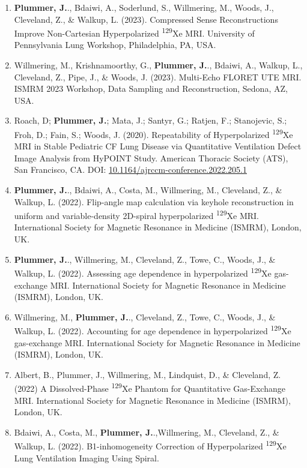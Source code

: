 \documentclass[12pt,]{scrartcl}
\begin{document}
\begin{enumerate}
  \item \textbf{Plummer, J.}., Bdaiwi, A., Soderlund, S., Willmering, M., Woods, J., Cleveland, Z., \& Walkup, L. (2023). Compressed Sense Reconstructions Improve Non-Cartesian Hyperpolarized \textsuperscript{129}Xe MRI. University of Pennsylvania Lung Workshop, Philadelphia, PA, USA.  
  
  \item Willmering, M., Krishnamoorthy, G., \textbf{Plummer, J.}., Bdaiwi, A., Walkup, L., Cleveland, Z., Pipe, J., \& Woods, J. (2023). Multi-Echo FLORET UTE MRI. ISMRM 2023 Workshop, Data Sampling and Reconstruction, Sedona, AZ, USA.  
  
  \item Roach, D; \textbf{ Plummer, J.}; Mata, J.; Santyr, G.; Ratjen, F.; Stanojevic, S.; Froh, D.; Fain, S.; Woods, J. (2020). Repeatability of Hyperpolarized \textsuperscript{129}Xe MRI in Stable Pediatric CF Lung Disease via Quantitative Ventilation Defect Image Analysis from HyPOINT Study. American Thoracic Society (ATS), San Francisco, CA. DOI: \href{https://www.atsjournals.org/doi/abs/10.1164/ajrccm-conference.2022.205.1_MeetingAbstracts.A2555}{10.1164/ajrccm-conference.2022.205.1}
  \item \textbf{Plummer, J.}., Bdaiwi, A., Costa, M., Willmering, M., Cleveland, Z., \& Walkup, L. (2022). Flip-angle map calculation via keyhole reconstruction in uniform and variable-density 2D-spiral hyperpolarized \textsuperscript{129}Xe MRI. International Society for Magnetic Resonance in Medicine (ISMRM), London, UK.
  \item \textbf{Plummer, J.}., Willmering, M., Cleveland, Z., Towe, C., Woods, J., \& Walkup, L. (2022). Assessing age dependence in hyperpolarized \textsuperscript{129}Xe gas-exchange MRI. International Society for Magnetic Resonance in Medicine (ISMRM), London, UK.
  \item  Willmering, M., \textbf{Plummer, J.}., Cleveland, Z., Towe, C., Woods, J., \& Walkup, L. (2022). Accounting for age dependence in hyperpolarized \textsuperscript{129}Xe gas-exchange MRI. International Society for Magnetic Resonance in Medicine (ISMRM), London, UK.
  \item Albert, B., Plummer, J., Willmering, M., Lindquist, D., \& Cleveland, Z. (2022) A Dissolved-Phase \textsuperscript{129}Xe Phantom for Quantitative Gas-Exchange MRI. International Society for Magnetic Resonance in Medicine (ISMRM), London, UK.
  \item  Bdaiwi, A., Costa, M., \textbf{Plummer, J.}.,Willmering, M., Cleveland, Z., \& Walkup, L. (2022). B1-inhomogeneity Correction of Hyperpolarized \textsuperscript{129}Xe Lung Ventilation Imaging Using Spiral.

\end{enumerate}
\end{document}
